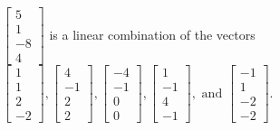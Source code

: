 \begin{exercise}
\begin{exerciseStatement}
  \end{exerciseStatement}
  \begin{exerciseAnswer}
   \(\left[\begin{array}{c}
5 \\
1 \\
-8 \\
4
\end{array}\right]\) 
  	 is  
	a linear combination of the vectors \(\left[\begin{array}{c}
1 \\
1 \\
2 \\
-2
\end{array}\right] , \left[\begin{array}{c}
4 \\
-1 \\
2 \\
2
\end{array}\right] , \left[\begin{array}{c}
-4 \\
-1 \\
0 \\
0
\end{array}\right] , \left[\begin{array}{c}
1 \\
-1 \\
4 \\
-1
\end{array}\right] , \text{ and } \left[\begin{array}{c}
-1 \\
1 \\
-2 \\
-2
\end{array}\right]\).

	
  


  \end{exerciseAnswer}
\end{exercise}